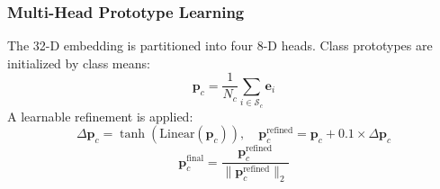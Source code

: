 \documentclass[10pt,letterpaper]{article}
\begin{document}
                                                                                                                 \subsubsection*{\textbf{Multi-Head Prototype Learning}}
                                                                                                                 The 32-D embedding is partitioned into four 8-D heads. Class prototypes are initialized by class means:
                                                                                                                 \begin{equation}
                                                                                                                 \label{eq:proto_init}
                                                                                                                 \mathbf{p}_c = \frac{1}{N_c}\sum_{i\in\mathcal{S}_c}\mathbf{e}_i
                                                                                                                 \end{equation}
                                                                                                                 A learnable refinement is applied:
                                                                                                                 \begin{equation}
                                                                                                                 \Delta \mathbf{p}_c = \tanh\left(\text{Linear}(\mathbf{p}_c)\right),\quad
                                                                                                                 \mathbf{p}_c^{\text{refined}} = \mathbf{p}_c + 0.1\times \Delta \mathbf{p}_c
                                                                                                                 \end{equation}
                                                                                                                 \begin{equation}
                                                                                                                 \mathbf{p}_c^{\text{final}} = \frac{\mathbf{p}_c^{\text{refined}}}{\|\mathbf{p}_c^{\text{refined}}\|_2}
                                                                                                                 \end{equation}
\end{document}
